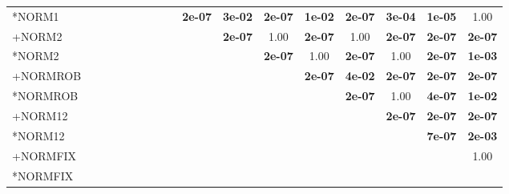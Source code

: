 \begin{table}[t]
{\begin{tabular}{lcccccccccccccccc}
*NORM1 &  &  &  &  &  &  &  &  & \textbf{2e-07} & \textbf{3e-02} & \textbf{2e-07} & \textbf{1e-02} & \textbf{2e-07} & \textbf{3e-04} & \textbf{1e-05} & 1.00 \\
+NORM2 &  &  &  &  &  &  &  &  &  & \textbf{2e-07} & 1.00 & \textbf{2e-07} & 1.00 & \textbf{2e-07} & \textbf{2e-07} & \textbf{2e-07} \\
*NORM2 &  &  &  &  &  &  &  &  &  &  & \textbf{2e-07} & 1.00 & \textbf{2e-07} & 1.00 & \textbf{2e-07} & \textbf{1e-03} \\
+NORMROB &  &  &  &  &  &  &  &  &  &  &  & \textbf{2e-07} & \textbf{4e-02} & \textbf{2e-07} & \textbf{2e-07} & \textbf{2e-07} \\
*NORMROB &  &  &  &  &  &  &  &  &  &  &  &  & \textbf{2e-07} & 1.00 & \textbf{4e-07} & \textbf{1e-02} \\
+NORM12 &  &  &  &  &  &  &  &  &  &  &  &  &  & \textbf{2e-07} & \textbf{2e-07} & \textbf{2e-07} \\
*NORM12 &  &  &  &  &  &  &  &  &  &  &  &  &  &  & \textbf{7e-07} & \textbf{2e-03} \\
+NORMFIX &  &  &  &  &  &  &  &  &  &  &  &  &  &  &  & 1.00 \\
*NORMFIX &  &  &  &  &  &  &  &  &  &  &  &  &  &  &  &  \\
\bottomrule
\end{tabular}
}
\end{table}

